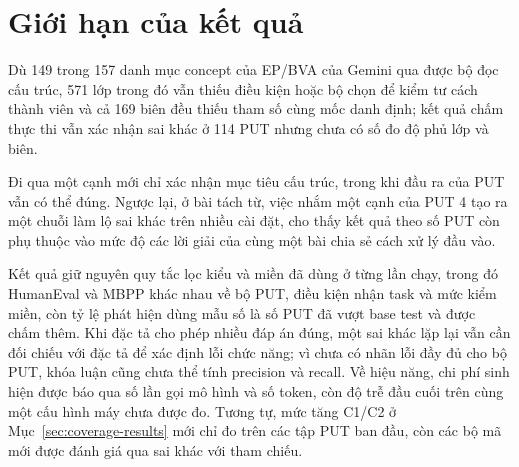 \section{Giới hạn của kết quả}

Dù 149 trong 157 danh mục concept của EP/BVA của Gemini qua được bộ đọc cấu trúc, 571 lớp trong đó vẫn thiếu điều kiện hoặc bộ chọn để kiểm tư cách thành viên và cả 169 biên đều thiếu tham số cùng mốc danh định; kết quả chấm thực thi vẫn xác nhận sai khác ở 114 PUT nhưng chưa có số đo độ phủ lớp và biên.

Đi qua một cạnh mới chỉ xác nhận mục tiêu cấu trúc, trong khi đầu ra của PUT vẫn có thể đúng. Ngược lại, ở bài tách từ, việc nhắm một cạnh của PUT 4 tạo ra một chuỗi làm lộ sai khác trên nhiều cài đặt, cho thấy kết quả theo số PUT còn phụ thuộc vào mức độ các lời giải của cùng một bài chia sẻ cách xử lý đầu vào.

Kết quả giữ nguyên quy tắc lọc kiểu và miền đã dùng ở từng lần chạy, trong đó HumanEval và MBPP khác nhau về bộ PUT, điều kiện nhận task và mức kiểm miền, còn tỷ lệ phát hiện dùng mẫu số là số PUT đã vượt base test và được chấm thêm. Khi đặc tả cho phép nhiều đáp án đúng, một sai khác lặp lại vẫn cần đối chiếu với đặc tả để xác định lỗi chức năng; vì chưa có nhãn lỗi đầy đủ cho bộ PUT, khóa luận cũng chưa thể tính precision và recall. Về hiệu năng, chi phí sinh hiện được báo qua số lần gọi mô hình và số token, còn độ trễ đầu cuối trên cùng một cấu hình máy chưa được đo. Tương tự, mức tăng C1/C2 ở Mục~\ref{sec:coverage-results} mới chỉ đo trên các tập PUT ban đầu, còn các bộ mã mới được đánh giá qua sai khác với tham chiếu.
